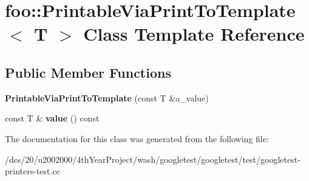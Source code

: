 \hypertarget{classfoo_1_1PrintableViaPrintToTemplate}{}\section{foo\+:\+:Printable\+Via\+Print\+To\+Template$<$ T $>$ Class Template Reference}
\label{classfoo_1_1PrintableViaPrintToTemplate}
\subsection*{Public Member Functions}
\begin{DoxyCompactItemize}
\item 
\mbox{\label{classfoo_1_1PrintableViaPrintToTemplate_a8fef9e8b59c9415624230b73469b517e}} 
{\bfseries Printable\+Via\+Print\+To\+Template} (const T \&a\+\_\+value)
\item 
\mbox{\label{classfoo_1_1PrintableViaPrintToTemplate_a14e0fcac9ae264e37e6212994b2920f6}} 
const T \& {\bfseries value} () const
\end{DoxyCompactItemize}


The documentation for this class was generated from the following file\+:\begin{DoxyCompactItemize}
\item 
/dcs/20/u2002000/4th\+Year\+Project/wash/googletest/googletest/test/googletest-\/printers-\/test.\+cc\end{DoxyCompactItemize}
